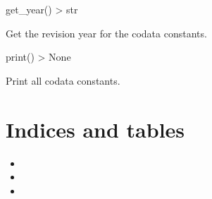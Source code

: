 \documentclass[a4paper,10pt,english]{sphinxmanual}
\begin{document}

\begin{fulllineitems}
\label{\detokenize{api/codedoc:pycodata._codata.get_year}}
\pysigstartsignatures
{}
\pysigstopsignatures
\sphinxAtStartPar
get\_year() \textendash{}\textgreater{} str

\sphinxAtStartPar
Get the revision year for the codata constants.

\end{fulllineitems}


\begin{fulllineitems}
\label{\detokenize{api/codedoc:pycodata._codata.print}}
\pysigstartsignatures
{}
\pysigstopsignatures
\sphinxAtStartPar
print() \textendash{}\textgreater{} None

\sphinxAtStartPar
Print all codata constants.

\end{fulllineitems}



\chapter{Indices and tables}
\label{\detokenize{index:indices-and-tables}}\begin{itemize}
\item {} 
\sphinxAtStartPar
{}

\item {} 
\sphinxAtStartPar
{}

\item {} 
\sphinxAtStartPar
{}

\end{itemize}


\renewcommand{\indexname}{Python Module Index}
\begin{sphinxtheindex}
\let\bigletter\sphinxstyleindexlettergroup
\bigletter{p}
\item\relax{}
\item\relax{}
\end{sphinxtheindex}

\renewcommand{\indexname}{Index}
\printindex
\end{document}
